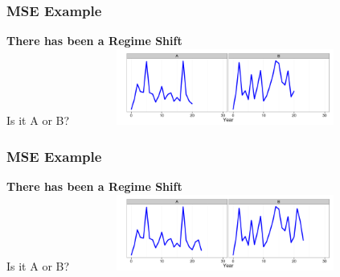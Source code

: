 \begin{frame}\frametitle{MSE Example} \smallskip\textbf{There has been a {\color{blue} Regime Shift}}\smallskip\\ Is it A or B? \includegraphics[height=25mm,width=100mm]{doug16.png}\end{frame}
\begin{frame}\frametitle{MSE Example} \smallskip\textbf{There has been a {\color{blue} Regime Shift}}\smallskip\\ Is it A or B? \includegraphics[height=25mm,width=100mm]{doug19.png}\end{frame}

